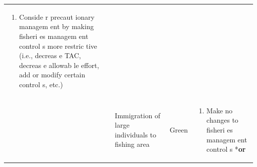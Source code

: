 \documentclass[]{book}
\providecommand{\tightlist}{%
  \setlength{\itemsep}{0pt}\setlength{\parskip}{0pt}}
\begin{document}
\begin{longtable}[]{@{}lllll@{}}
\begin{minipage}[t]{0.19\columnwidth}
\begin{enumerate}
\def\labelenumi{\arabic{enumi}.}
\tightlist
\item
  Conside r precaut ionary managem ent by making fisheri es managem ent
  control s more restric tive (i.e., decreas e TAC, decreas e allowab le
  effort, add or modify certain control s, etc.)
\end{enumerate}\strut
\end{minipage}\tabularnewline
\begin{minipage}[t]{0.19\columnwidth}\raggedright\strut
\strut
\end{minipage} & \begin{minipage}[t]{0.19\columnwidth}\raggedright\strut
\strut
\end{minipage} & \begin{minipage}[t]{0.19\columnwidth}\raggedright\strut
Immigration of large individuals to fishing area\strut
\end{minipage} & \begin{minipage}[t]{0.19\columnwidth}\raggedright\strut
Green\strut
\end{minipage} & \begin{minipage}[t]{0.19\columnwidth}\raggedright\strut
\begin{enumerate}
\def\labelenumi{\arabic{enumi}.}
\tightlist
\item
  Make no changes to fisheri es managem ent control s *\textbf{or}
\end{enumerate}


\end{minipage}
\end{longtable}
\end{document}
